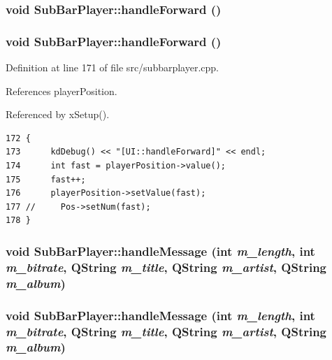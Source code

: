 \subsubsection{\setlength{\rightskip}{0pt plus 5cm}void Sub\-Bar\-Player::handle\-Forward ()\hspace{0.3cm}{\tt  [slot]}}\label{classSubBarPlayer_SubBarPlayeri26}


\subsubsection{\setlength{\rightskip}{0pt plus 5cm}void Sub\-Bar\-Player::handle\-Forward ()\hspace{0.3cm}{\tt  [slot]}}\label{classSubBarPlayer_SubBarPlayeri8}




Definition at line 171 of file src/subbarplayer.cpp.

References player\-Position.

Referenced by x\-Setup().



\footnotesize\begin{verbatim}172 {
173      kdDebug() << "[UI::handleForward]" << endl;
174      int fast = playerPosition->value();
175      fast++;
176      playerPosition->setValue(fast);
177 //     Pos->setNum(fast);
178 }
\end{verbatim}\normalsize 
{}
\subsubsection{\setlength{\rightskip}{0pt plus 5cm}void Sub\-Bar\-Player::handle\-Message (int {\em m\_\-length}, int {\em m\_\-bitrate}, QString {\em m\_\-title}, QString {\em m\_\-artist}, QString {\em m\_\-album})\hspace{0.3cm}{\tt  [slot]}}\label{classSubBarPlayer_SubBarPlayeri28}


\subsubsection{\setlength{\rightskip}{0pt plus 5cm}void Sub\-Bar\-Player::handle\-Message (int {\em m\_\-length}, int {\em m\_\-bitrate}, QString {\em m\_\-title}, QString {\em m\_\-artist}, QString {\em m\_\-album})\hspace{0.3cm}{\tt  [slot]}}\label{classSubBarPlayer_SubBarPlayeri10}




